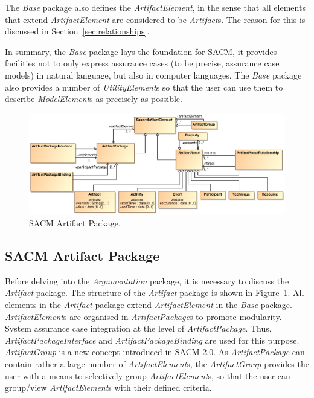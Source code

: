 The \textit{Base} package also defines the \textit{ArtifactElement}, in the sense that all elements that extend \textit{ArtifactElement} are considered to be \textit{Artifact}s. The reason for this is discussed in Section~\ref{sec:relationships}. 

In summary, the \textit{Base} package lays the foundation for SACM, it provides facilities not to only express assurance cases (to be precise, assurance case models) in natural language, but also in computer languages. The \textit{Base} package also provides a number of \textit{UtilityElement}s so that the user can use them to describe \textit{ModelElement}s as precisely as possible.

\begin{figure}
	\centering
	\includegraphics[width=1\linewidth]{Artifact.eps}
	\caption{SACM Artifact Package.}
	\label{fig:arti}
\end{figure}

\subsection{SACM Artifact Package}
\label{sec:artiPack}
Before delving into the \textit{Argumentation} package, it is necessary to discuss the \textit{Artifact} package. The structure of the \textit{Artifact} package is shown in Figure~\ref{fig:arti}. 
All elements in the \textit{Artifact} package extend \textit{ArtifactElement} in the \textit{Base} package. \textit{ArtifactElement}s are organised in \textit{ArtifactPackage}s to promote modularity. System assurance case integration at the level of \textit{ArtifactPackage}. Thus, \textit{ArtifactPackageInterface} and \textit{ArtifactPackageBinding} are used for this purpose.
\textit{ArtifactGroup} is a new concept introduced in SACM 2.0. As \textit{ArtifactPackage} can contain rather a large number of \textit{ArtifactElement}s, the \textit{ArtifactGroup} provides the user with a means to selectively group \textit{ArtifactElement}s, so that the user can group/view \textit{ArtifactElement}s with their defined criteria.

